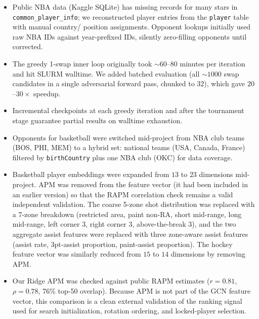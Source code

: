 \documentclass[11pt,letterpaper]{article}
\begin{document}
\begin{itemize}[leftmargin=*]
  \item Public NBA data (Kaggle SQLite) has missing records for many
    stars in \texttt{common\_player\_info}; we reconstructed player
    entries from the \texttt{player} table with manual country/
    position assignments. Opponent lookups initially used raw NBA IDs
    against year-prefixed IDs, silently zero-filling opponents until
    corrected.
  \item The greedy 1-swap inner loop originally took $\sim 60$--$80$
    minutes per iteration and hit SLURM walltime. We added
    batched evaluation (all $\sim 1000$ swap candidates in a single
    adversarial forward pass, chunked to $32$), which gave $20$--$30
    \times$ speedup.
  \item Incremental checkpoints at each greedy iteration and after the
    tournament stage guarantee partial results on walltime exhaustion.
  \item Opponents for basketball were switched mid-project from NBA
    club teams (BOS, PHI, MEM) to a hybrid set: national teams (USA,
    Canada, France) filtered by \texttt{birthCountry} plus one NBA
    club (OKC) for data coverage.
  \item Basketball player embeddings were expanded from $13$ to $23$
    dimensions mid-project. APM was removed from the feature vector
    (it had been included in an earlier version) so that the RAPM
    correlation check remains a valid independent validation. The
    coarse 5-zone shot distribution was replaced with a 7-zone
    breakdown (restricted area, paint non-RA, short mid-range, long
    mid-range, left corner 3, right corner 3, above-the-break 3), and
    the two aggregate assist features were replaced with three
    zone-aware assist features (assist rate, 3pt-assist proportion,
    paint-assist proportion). The hockey feature vector was similarly
    reduced from $15$ to $14$ dimensions by removing APM.
  \item Our Ridge APM was checked against public RAPM estimates
    ($r = 0.81$, $\rho = 0.78$, 76\% top-50 overlap). Because APM is
    not part of the GCN feature vector, this comparison is a clean
    external validation of the ranking signal used for search
    initialization, rotation ordering, and locked-player selection.
\end{itemize}
\end{document}
